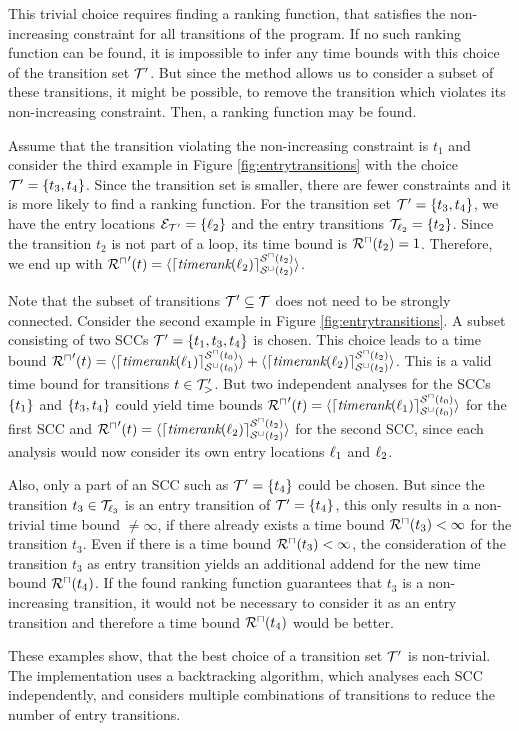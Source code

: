 This trivial choice requires finding a ranking function, that satisfies the non-increasing constraint for all transitions of the program.
If no such ranking function can be found, it is impossible to infer any time bounds with this choice of the transition set $\mathcal{T}'$.
But since the method allows us to consider a subset of these transitions, it might be possible, to remove the transition which violates its non-increasing constraint.
Then, a ranking function may be found.

Assume that the transition violating the non-increasing constraint is $t_1$ and consider the third example in Figure \ref{fig:entrytransitions} with the choice $\mathcal{T}' = \lbrace t_3, t_4 \rbrace$.
Since the transition set is smaller, there are fewer constraints and it is more likely to find a ranking function.
For the transition set $\mathcal{T}' = \lbrace t_3, t_4 \rbrace$, we have the entry locations $\mathcal{E}_{\mathcal{T}'} = \lbrace \ell_2 \rbrace$ and the entry transitions $\mathcal{T}_{\ell_2} = \lbrace t_2 \rbrace$.
Since the transition $t_2$ is not part of a loop, its time bound is ${\mathcal{R}^\sqcap}(t_2) = 1$.
Therefore, we end up with ${\mathcal{R}^\sqcap}'(t) = \langle\lceil \emph{timerank}(\ell_2) \rceil^{{\mathcal{S}^\sqcap}(t_2)}_{{\mathcal{S}^\sqcup}(t_2)}\rangle$.

Note that the subset of transitions $\mathcal{T}' \subseteq \mathcal{T}$ does not need to be strongly connected.
Consider the second example in Figure \ref{fig:entrytransitions}.
A subset consisting of two SCCs $\mathcal{T}' = \lbrace t_1, t_3, t_4 \rbrace$ is chosen.
This choice leads to a time bound ${\mathcal{R}^\sqcap}'(t) = \langle\lceil \emph{timerank}(\ell_1) \rceil^{{\mathcal{S}^\sqcap}(t_0)}_{{\mathcal{S}^\sqcup}(t_0)}\rangle + \langle\lceil \emph{timerank}(\ell_2) \rceil^{{\mathcal{S}^\sqcap}(t_2)}_{{\mathcal{S}^\sqcup}(t_2)}\rangle$.
This is a valid time bound for transitions $t \in \mathcal{T}'_>$.
But two independent analyses for the SCCs $\lbrace t_1 \rbrace$ and $\lbrace t_3, t_4 \rbrace$ could yield time bounds ${\mathcal{R}^\sqcap}'(t) = \langle\lceil \emph{timerank}(\ell_1) \rceil^{{\mathcal{S}^\sqcap}(t_0)}_{{\mathcal{S}^\sqcup}(t_0)}\rangle$ for the first SCC and ${\mathcal{R}^\sqcap}'(t) = \langle\lceil \emph{timerank}(\ell_2) \rceil^{{\mathcal{S}^\sqcap}(t_2)}_{{\mathcal{S}^\sqcup}(t_2)}\rangle$ for the second SCC, since each analysis would now consider its own entry locations $\ell_1$ and $\ell_2$.

Also, only a part of an SCC such as $\mathcal{T}' = \lbrace t_4 \rbrace$ could be chosen.
But since the transition $t_3 \in \mathcal{T}_{\ell_3}$ is an entry transition of $\mathcal{T}' = \lbrace t_4 \rbrace$, this only results in a non-trivial time bound $\neq \infty$, if there already exists a time bound ${\mathcal{R}^\sqcap}(t_3) < \infty$ for the transition $t_3$.
Even if there is a time bound ${\mathcal{R}^\sqcap}(t_3) < \infty$, the consideration of the transition $t_3$ as entry transition yields an additional addend for the new time bound ${\mathcal{R}^\sqcap}(t_4)$.
If the found ranking function guarantees that $t_3$ is a non-increasing transition, it would not be necessary to consider it as an entry transition and therefore a time bound ${\mathcal{R}^\sqcap}(t_4)$ would be better.

These examples show, that the best choice of a transition set $\mathcal{T}'$ is non-trivial.
The implementation uses a backtracking algorithm, which analyses each SCC independently, and considers multiple combinations of transitions to reduce the number of entry transitions.
